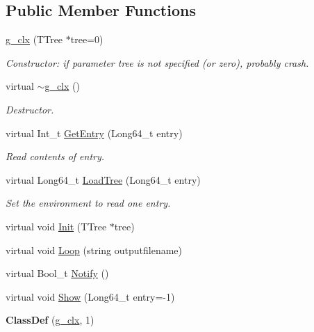 \subsection*{Public Member Functions}
\begin{DoxyCompactItemize}
\item 
\hypertarget{classg__clx_aa619daf508fe1d6bddb000af26630f31}{\hyperlink{classg__clx_aa619daf508fe1d6bddb000af26630f31}{g\-\_\-clx} (T\-Tree $\ast$tree=0)}\label{classg__clx_aa619daf508fe1d6bddb000af26630f31}

\begin{DoxyCompactList}\small\item\em Constructor\-: if parameter tree is not specified (or zero), probably crash. \end{DoxyCompactList}\item 
\hypertarget{classg__clx_adbe899d82aba9fc16ec17f47c0ce894e}{virtual \hyperlink{classg__clx_adbe899d82aba9fc16ec17f47c0ce894e}{$\sim$g\-\_\-clx} ()}\label{classg__clx_adbe899d82aba9fc16ec17f47c0ce894e}

\begin{DoxyCompactList}\small\item\em Destructor. \end{DoxyCompactList}\item 
\hypertarget{classg__clx_ab4c53e12e70c3671ff8895fc388dd7d2}{virtual Int\-\_\-t \hyperlink{classg__clx_ab4c53e12e70c3671ff8895fc388dd7d2}{Get\-Entry} (Long64\-\_\-t entry)}\label{classg__clx_ab4c53e12e70c3671ff8895fc388dd7d2}

\begin{DoxyCompactList}\small\item\em Read contents of entry. \end{DoxyCompactList}\item 
\hypertarget{classg__clx_a0aab3745bdb3db08757c974eebffbe39}{virtual Long64\-\_\-t \hyperlink{classg__clx_a0aab3745bdb3db08757c974eebffbe39}{Load\-Tree} (Long64\-\_\-t entry)}\label{classg__clx_a0aab3745bdb3db08757c974eebffbe39}

\begin{DoxyCompactList}\small\item\em Set the environment to read one entry. \end{DoxyCompactList}\item 
virtual void \hyperlink{classg__clx_a92531261155ea15bee6b74c7e491132a}{Init} (T\-Tree $\ast$tree)
\item 
virtual void \hyperlink{classg__clx_a9d5de859df4bfbb746726661ff1d24a9}{Loop} (string outputfilename)
\item 
virtual Bool\-\_\-t \hyperlink{classg__clx_a1fe81316168bc18dc2325ca5595577a9}{Notify} ()
\item 
virtual void \hyperlink{classg__clx_ae86183470c7bb8db45753aa4c86f1d41}{Show} (Long64\-\_\-t entry=-\/1)
\item 
\hypertarget{classg__clx_a8d0a8ed3a7cc55ca97aeb77f4183d3b8}{{\bfseries Class\-Def} (\hyperlink{classg__clx}{g\-\_\-clx}, 1)}\label{classg__clx_a8d0a8ed3a7cc55ca97aeb77f4183d3b8}

\end{DoxyCompactItemize}
